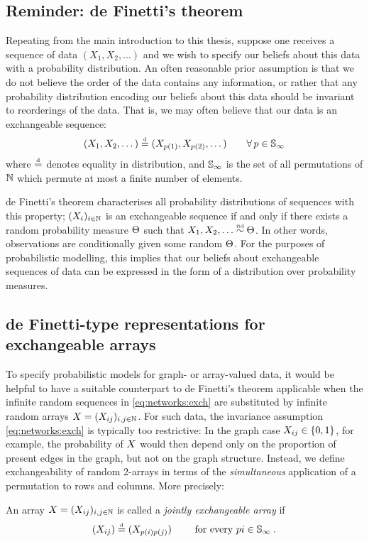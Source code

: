 \subsection{Reminder: de Finetti's theorem}

Repeating from the main introduction to this thesis, suppose one receives a sequence of data $(X_1, X_2, \dots)$ and we wish to specify our beliefs about this data with a probability distribution.
An often reasonable prior assumption is that we do not believe the order of the data contains any information, or rather that any probability distribution encoding our beliefs about this data should be invariant to reorderings of the data.
That is, we may often believe that our data is an exchangeable sequence:
\[
  \label{eq:networks:exch}
  (X_1, X_2, \dots) \stackrel{\mbox{\tiny d}}{=} (X_{p(1)}, X_{p(2)}, \dots) \qquad \forall\, p\in\mathbb{S}_{\infty}
\]
where $\stackrel{\mbox{\tiny d}}{=}$ denotes equality in distribution, and $\mathbb{S}_{\infty}$ is the set of all permutations of $\mathbb{N}$ which permute at most a finite number of elements.

de Finetti's theorem \citep[e.g.][]{Kallenberg2002-il} characterises all probability distributions of sequences with this property;  $(X_i)_{i\in\mathbb{N}}$ is an exchangeable sequence if and only if there exists a random probability measure $\Theta$ such that $X_1,X_2,\ldots\overset{\mbox{\tiny iid}}{\sim}\Theta$.
In other words, observations are conditionally \iid given some random $\Theta$.
For the purposes of probabilistic modelling, this implies that our beliefs about exchangeable sequences of data can be expressed in the form of a distribution over probability measures.

\subsection{de Finetti-type representations for exchangeable arrays}

To specify probabilistic models for graph- or array-valued data, it would be helpful to have a suitable counterpart to de Finetti's theorem applicable when the infinite random sequences in \eqref{eq:networks:exch} are substituted by infinite random arrays $X=(X_{ij})_{i,j\in\mathbb{N}}$.
For such data, the invariance assumption \eqref{eq:networks:exch} is typically too restrictive: In the graph case $X_{ij}\in\lbrace 0,1\rbrace$, for example, the probability of $X$ would then depend only on the proportion of present edges in the graph, but not on the graph structure.
Instead, we define exchangeability of random 2-arrays in terms of the \emph{simultaneous} application of a permutation to rows and columns.
More precisely:
\begin{definition}
  An array $X=(X_{ij})_{i,j\in\mathbb{N}}$ is called a \emph{jointly exchangeable array} if 
  \begin{equation}
    \label{eq:jointly:ex}
    (X_{ij})\stackrel{\mbox{\tiny d}}{=}(X_{p(i)p(j)}) \qquad\text{ for every }pi\in\mathbb{S}_{\infty}\;.
  \end{equation}
\end{definition}

